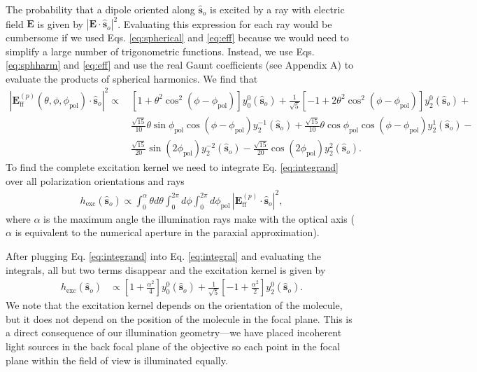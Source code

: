 \documentclass{osa-article}
\providecommand{\mb}[1]{\mathbf{#1}}
\providecommand{\so}{\mathbf{\hat{s}}_o}
\begin{document}
The probability that a dipole oriented along $\so{}$ is excited by a ray with
electric field $\mb{E}$ is given by $|\mb{E}\cdot\so{}|^2$. Evaluating this
expression for each ray would be cumbersome if we used Eqs. \ref{eq:spherical}
and \ref{eq:eff} because we would need to simplify a large number of
trigonometric functions. Instead, we use Eqs. \ref{eq:sphharm} and \ref{eq:eff}
and use the real Gaunt coefficients (see Appendix A) to evaluate the products of
spherical harmonics. We find that
\begin{align}
  |\mb{E}_{\text{ff}}^{(p)}(\theta, \phi, \phi_{\text{pol}}) \cdot \so{}|^2 \propto\, &\left[1 + \theta^2\cos^2(\phi - \phi_{\text{pol}})\right]y_0^0(\so{}) + \frac{1}{\sqrt{5}}\left[ - 1 + 2\theta^2\cos^2(\phi - \phi_{\text{pol}})\right]y_2^{0}(\so{}) +\nonumber \\
                                   &\frac{\sqrt{15}}{10}\theta\sin\phi_{\text{pol}}\cos(\phi - \phi_{\text{pol}})y_2^{-1}(\so{}) + \frac{\sqrt{15}}{10}\theta\cos\phi_{\text{pol}}\cos(\phi - \phi_{\text{pol}})y_2^{1}(\so{}) -\nonumber \\  
                                   &\frac{\sqrt{15}}{20}\sin(2\phi_{\text{pol}})y_2^{-2}(\so{}) - \frac{\sqrt{15}}{20}\cos(2\phi_{\text{pol}})y_2^{2}(\so{}).\label{eq:integrand}
\end{align}
To find the complete excitation kernel we need to integrate Eq.
\ref{eq:integrand} over all polarization orientations and rays
\begin{align}
  h_{\text{exc}}(\so{}) \propto \int_0^{\alpha}\theta d\theta\int_0^{2\pi}d\phi\int_0^{2\pi}d\phi_{\text{pol}}\, |\mb{E}_{\text{ff}}^{(p)} \cdot \so{}|^2, \label{eq:integral}
\end{align}
where $\alpha$ is the maximum angle the illumination rays make with the optical
axis ($\alpha$ is equivalent to the numerical aperture in the paraxial
approximation).

After plugging Eq. \ref{eq:integrand} into Eq. \ref{eq:integral} and evaluating
the integrals, all but two terms disappear and the 
excitation kernel is given by
\begin{align}
  h_{\text{exc}}(\so{}) &\propto \left[1 + \frac{\alpha^2}{4}\right]y_0^0(\so{}) + \frac{1}{\sqrt{5}}\left[-1 + \frac{\alpha^2}{2}\right]y_2^0(\so{}). \label{eq:excitation}
\end{align}
We note that the excitation kernel depends on the orientation of the molecule,
but it does not depend on the position of the molecule in the focal plane. This
is a direct consequence of our illumination geometry---we have placed incoherent
light sources in the back focal plane of the objective so each point in the
focal plane within the field of view is illuminated equally.
\end{document}
